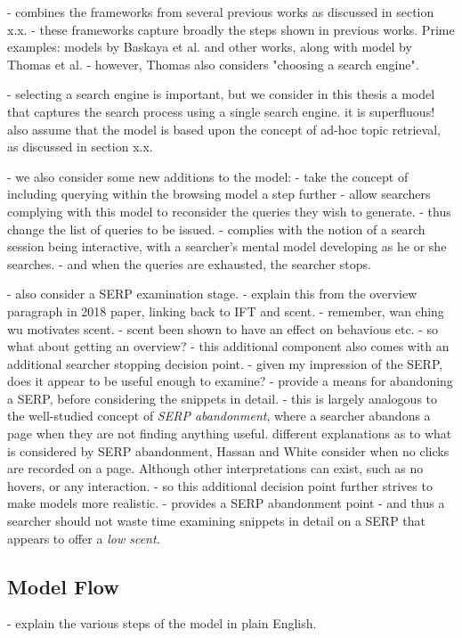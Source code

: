 - combines the frameworks from several previous works as discussed in section x.x.
- these frameworks capture broadly the steps shown in previous works. Prime examples: models by Baskaya et al. and other works, along with model by Thomas et al.
- however, Thomas also considers "choosing a search engine".

- selecting a search engine is important, but we consider in this thesis a model that captures the search process using a single search engine. it is superfluous! also assume that the model is based upon the concept of ad-hoc topic retrieval, as discussed in section x.x.

- we also consider some new additions to the model:
    - take the concept of including querying within the browsing model a step further
    - allow searchers complying with this model to reconsider the queries they wish to generate.
    - thus change the list of queries to be issued.
    - complies with the notion of a search session being interactive, with a searcher's mental model developing as he or she searches.
    - and when the queries are exhausted, the searcher stops.
    
    - also consider a SERP examination stage.
    - explain this from the overview paragraph in 2018 paper, linking back to IFT and scent.
    - remember, wan ching wu motivates scent.
        - scent been shown to have an effect on behavious etc.
        - so what about getting an overview?
    - this additional component also comes with an additional searcher stopping decision point.
        - given my impression of the SERP, does it appear to be useful enough to examine?
        - provide a means for abandoning a SERP, before considering the snippets in detail.
        - this is largely analogous to the well-studied concept of \emph{SERP abandonment}, where a searcher abandons a page when they are not finding anything useful. different explanations as to what is considered by SERP abandonment, Hassan and White consider when no clicks are recorded on a page. Although other interpretations can exist, such as no hovers, or any interaction.
        - so this additional decision point further strives to make models more realistic.
        - provides a SERP abandonment point
        - and thus a searcher should not waste time examining snippets in detail on a SERP that appears to offer a \emph{low scent.}


\subsection{Model Flow}
- explain the various steps of the model in plain English.

